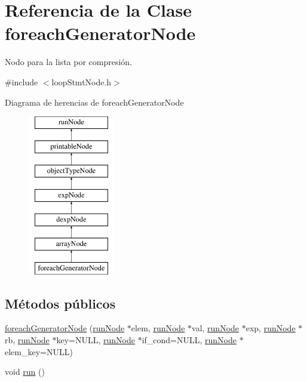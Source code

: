 \hypertarget{classforeachGeneratorNode}{\section{Referencia de la Clase foreach\-Generator\-Node}
\label{classforeachGeneratorNode}
}


Nodo para la lista por compresión.  




{\ttfamily \#include $<$loop\-Stmt\-Node.\-h$>$}

Diagrama de herencias de foreach\-Generator\-Node\begin{figure}[H]
\begin{center}
\leavevmode
\includegraphics[height=7.000000cm]{classforeachGeneratorNode}
\end{center}
\end{figure}
\subsection*{Métodos públicos}
\begin{DoxyCompactItemize}
\item 
\hyperlink{classforeachGeneratorNode_af80083b17f10891c36164b3a07118736}{foreach\-Generator\-Node} (\hyperlink{classrunNode}{run\-Node} $\ast$elem, \hyperlink{classrunNode}{run\-Node} $\ast$val, \hyperlink{classrunNode}{run\-Node} $\ast$exp, \hyperlink{classrunNode}{run\-Node} $\ast$rb, \hyperlink{classrunNode}{run\-Node} $\ast$key=N\-U\-L\-L, \hyperlink{classrunNode}{run\-Node} $\ast$if\-\_\-cond=N\-U\-L\-L, \hyperlink{classrunNode}{run\-Node} $\ast$elem\-\_\-key=N\-U\-L\-L)
\item 
void \hyperlink{classforeachGeneratorNode_a2769b5956850366b99fa9f9d0e89ec37}{run} ()
\end{DoxyCompactItemize}
